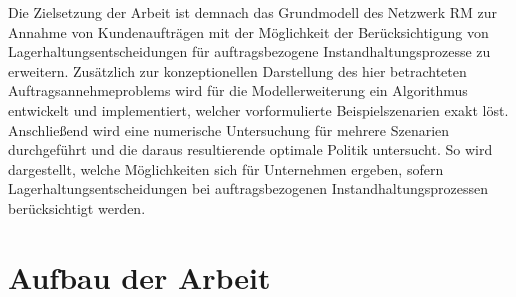 
Die Zielsetzung der Arbeit ist demnach das Grundmodell des Netzwerk RM zur Annahme von Kundenaufträgen mit der Möglichkeit der Berücksichtigung von Lagerhaltungsentscheidungen für auftragsbezogene Instandhaltungsprozesse zu erweitern. Zusätzlich zur konzeptionellen Darstellung des hier betrachteten Auftragsannehmeproblems wird für die Modellerweiterung ein Algorithmus entwickelt und implementiert, welcher vorformulierte Beispielszenarien exakt löst. Anschließend wird eine numerische Untersuchung für mehrere Szenarien durchgeführt und die daraus resultierende optimale Politik untersucht. So wird dargestellt, welche Möglichkeiten sich für Unternehmen ergeben, sofern Lagerhaltungsentscheidungen bei auftragsbezogenen Instandhaltungsprozessen berücksichtigt werden.

\section{Aufbau der Arbeit}

